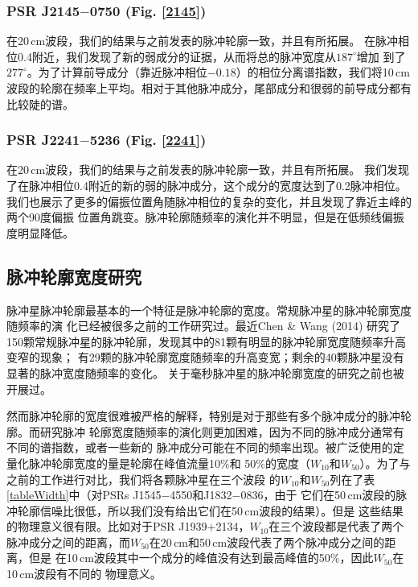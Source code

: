 \subsubsection{PSR J2145$-$0750 (Fig. \ref{2145})}

在20\,cm波段，我们的结果与之前发表的脉冲轮廓一致，并且有所拓展\supercite{Yan11a}。
在脉冲相位0.4附近，我们发现了新的弱成分的证据，从而将总的脉冲宽度从$187^{\circ}$增加
到了$277^{\circ}$。为了计算前导成分（靠近脉冲相位$-0.18$）的相位分离谱指数，我们将10\,cm
波段的轮廓在频率上平均。相对于其他脉冲成分，尾部成分和很弱的前导成分都有比较陡的谱。

\subsubsection{PSR J2241$-$5236 (Fig. \ref{2241})}

在20\,cm波段，我们的结果与之前发表的脉冲轮廓一致，并且有所拓展\supercite{Yan11a}。
我们发现了在脉冲相位0.4附近的新的弱的脉冲成分，这个成分的宽度达到了0.2脉冲相位。
我们也展示了更多的偏振位置角随脉冲相位的复杂的变化，并且发现了靠近主峰的两个90度偏振
位置角跳变。脉冲轮廓随频率的演化并不明显，但是在低频线偏振度明显降低。

\subsection{脉冲轮廓宽度研究}

脉冲星脉冲轮廓最基本的一个特征是脉冲轮廓的宽度。常规脉冲星的脉冲轮廓宽度随频率的演
化已经被很多之前的工作研究过\supercite{Cordes78,Thorsett91}。最近Chen \& Wang (2014)\supercite{Chen14}
研究了150颗常规脉冲星的脉冲轮廓，发现其中的81颗有明显的脉冲轮廓宽度随频率升高变窄的现象；
有29颗的脉冲轮廓宽度随频率的升高变宽；剩余的40颗脉冲星没有显著的脉冲宽度随频率的变化。
关于毫秒脉冲星的脉冲轮廓宽度的研究之前也被开展过\supercite{Kramer99}。

然而脉冲轮廓的宽度很难被严格的解释，特别是对于那些有多个脉冲成分的脉冲轮廓。而研究脉冲
轮廓宽度随频率的演化则更加困难，因为不同的脉冲成分通常有不同的谱指数，或者一些新的
脉冲成分可能在不同的频率出现。被广泛使用的定量化脉冲轮廓宽度的量是轮廓在峰值流量10\%和
50\%的宽度（$W_{10}$和$W_{50}$）。为了与之前的工作进行对比，我们将各颗脉冲星在三个波段
的$W_{10}$和$W_{50}$列在了表\ref{tableWidth}中（对PSRs J1545$-$4550和J1832$-$0836，由于
它们在50\,cm波段的脉冲轮廓信噪比很低，所以我们没有给出它们在50\,cm波段的结果）。但是
这些结果的物理意义很有限。比如对于PSR J1939$+$2134，$W_{10}$在三个波段都是代表了两个
脉冲成分之间的距离，而$W_{50}$在20\,cm和50\,cm波段代表了两个脉冲成分之间的距离，但是
在10\,cm波段其中一个成分的峰值没有达到最高峰值的50\%，因此$W_{50}$在10\,cm波段有不同的
物理意义。

